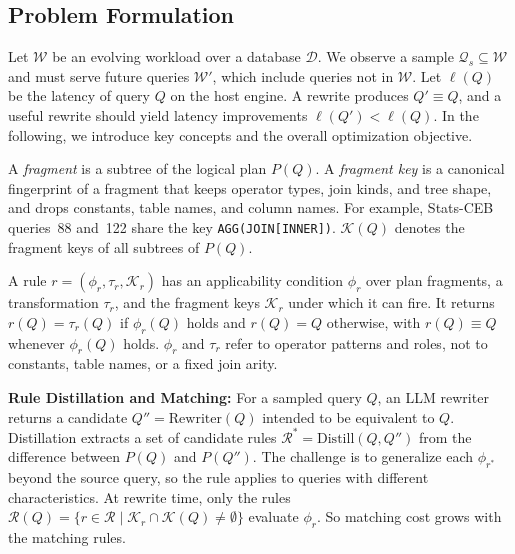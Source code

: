 \subsection{Problem Formulation}
\label{sec:problem}
Let $\mathcal{W}$ be an evolving workload over a database $\mathcal{D}$.
We observe a sample $\mathcal{Q}_s \subseteq \mathcal{W}$ and must serve future queries $\mathcal{W}'$, which include queries not in $\mathcal{W}$.
Let $\ell(Q)$ be the latency of query $Q$ on the host engine.
A rewrite produces $Q' \equiv Q$, and a useful rewrite should yield latency improvements $\ell(Q') < \ell(Q)$. In the following, we introduce key concepts and the overall optimization objective. 

\begin{definition}[Fragments]
A \emph{fragment} is a subtree of the logical plan $P(Q)$.
A \emph{fragment key} is a canonical fingerprint of a fragment that keeps operator types, join kinds, and tree shape, and drops constants, table names, and column names.
For example, Stats-CEB queries~88 and~122 share the key \texttt{AGG(JOIN[INNER])}.
$\mathcal{K}(Q)$ denotes the fragment keys of all subtrees of $P(Q)$.
\end{definition}

\begin{definition}
\label{def:rule}
A rule $r = (\phi_r, \tau_r, \mathcal{K}_r)$ has an applicability condition $\phi_r$ over plan fragments, a transformation $\tau_r$, and the fragment keys $\mathcal{K}_r$ under which it can fire.
It returns $r(Q) = \tau_r(Q)$ if $\phi_r(Q)$ holds and $r(Q) = Q$ otherwise, with $r(Q) \equiv Q$ whenever $\phi_r(Q)$ holds.
$\phi_r$ and $\tau_r$ refer to operator patterns and roles, not to constants, table names, or a fixed join arity.
\end{definition}

\textbf{Rule Distillation and Matching:}
For a sampled query $Q$, an LLM rewriter returns a candidate $Q'' = \mathrm{Rewriter}(Q)$ intended to be equivalent to $Q$.
Distillation extracts a set of candidate rules $\mathcal{R}^* = \mathrm{Distill}(Q, Q'')$ from the difference between $P(Q)$ and $P(Q'')$.
The challenge is to generalize each $\phi_{r^*}$ beyond the source query, so the rule applies to queries with different characteristics.
At rewrite time, only the rules $\mathcal{R}(Q) = \{ r \in \mathcal{R} \mid \mathcal{K}_r \cap \mathcal{K}(Q) \neq \emptyset \}$ evaluate $\phi_r$.
So matching cost grows with the matching rules. %

